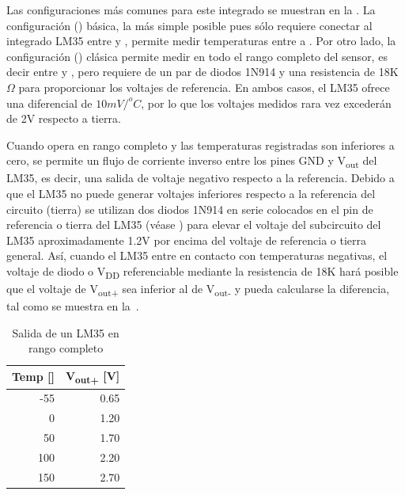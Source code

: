 Las configuraciones más comunes para este integrado se muestran en la . La configuración () básica, la más simple posible pues sólo requiere conectar al integrado LM35 entre \VCC y \GND, permite medir temperaturas entre  a .
Por otro lado, la configuración () clásica permite medir en todo el rango completo del sensor, es decir entre  y , pero requiere de un par de diodos 1N914 y una resistencia de 18K$\Omega$ para proporcionar los voltajes de referencia.
En ambos casos, el LM35 ofrece una diferencial de $10mV/^{o}C$, por lo que los voltajes medidos rara vez excederán de 2V respecto a tierra.

Cuando opera en rango completo y las temperaturas registradas son inferiores a cero, se permite un flujo de corriente inverso entre los pines GND y V\textsubscript{out} del LM35, es decir, una salida de voltaje negativo respecto a la referencia.
Debido a que el LM35 no puede generar voltajes inferiores respecto a la referencia del circuito (tierra) se utilizan dos diodos 1N914 en serie colocados en el pin de referencia o tierra del LM35 (véase ) para elevar el voltaje del subcircuito del LM35 aproximadamente 1.2V por encima del voltaje de referencia o tierra general.
Así, cuando el LM35 entre en contacto con temperaturas negativas, el voltaje de diodo o V\textsubscript{DD} referenciable mediante la resistencia de 18K hará posible que el voltaje de V\textsubscript{out+} sea inferior al de V\textsubscript{out-} y pueda calcularse la diferencia, tal como se muestra en la~.

\begin{table}
	\centering
	\caption{Salida de un LM35 en rango completo}%
	\label{tab:lm35} %
	\begin{tabular}{rr}%
	\toprule
	Temp [\degreesC{}]& V\textsubscript{out+} [V] \\
	\midrule
	-55 & 0.65 \\
	  0 & 1.20 \\
	 50 & 1.70 \\
	100 & 2.20 \\
	150 & 2.70 \\
	\bottomrule
	\end{tabular}
\end{table}
